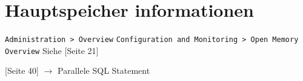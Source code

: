 \section{Hauptspeicher informationen}

\verb+Administration > Overview+
\verb+Configuration and Monitoring > Open Memory Overview+
Siehe \cite{sap:hana:performance_guide}[Seite 21]


\cite{sap:hana:performance_guide}[Seite 40] $\rightarrow$ Parallele SQL Statement





